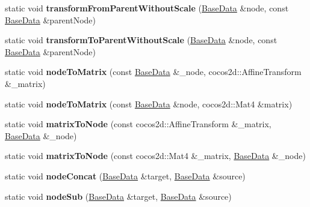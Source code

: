 \begin{DoxyCompactItemize}
\item 
\mbox{\label{classcocostudio_1_1TransformHelp_ab9fa5831a591b586040083c97b14e1a8}} 
static void {\bfseries transform\+From\+Parent\+Without\+Scale} (\hyperlink{classcocostudio_1_1BaseData}{Base\+Data} \&node, const \hyperlink{classcocostudio_1_1BaseData}{Base\+Data} \&parent\+Node)
\item 
\mbox{\label{classcocostudio_1_1TransformHelp_a80491e04b56e3205f461701a331e669e}} 
static void {\bfseries transform\+To\+Parent\+Without\+Scale} (\hyperlink{classcocostudio_1_1BaseData}{Base\+Data} \&node, const \hyperlink{classcocostudio_1_1BaseData}{Base\+Data} \&parent\+Node)
\item 
\mbox{\label{classcocostudio_1_1TransformHelp_a48cb72fa88aa6185ca992bf0713e0189}} 
static void {\bfseries node\+To\+Matrix} (const \hyperlink{classcocostudio_1_1BaseData}{Base\+Data} \&\+\_\+node, cocos2d\+::\+Affine\+Transform \&\+\_\+matrix)
\item 
\mbox{\label{classcocostudio_1_1TransformHelp_ad5b5773799a1db6e3c66c9d9bb96fde7}} 
static void {\bfseries node\+To\+Matrix} (const \hyperlink{classcocostudio_1_1BaseData}{Base\+Data} \&node, cocos2d\+::\+Mat4 \&matrix)
\item 
\mbox{\label{classcocostudio_1_1TransformHelp_a4ba91cbe8cf6d973ca702a2c361d1585}} 
static void {\bfseries matrix\+To\+Node} (const cocos2d\+::\+Affine\+Transform \&\+\_\+matrix, \hyperlink{classcocostudio_1_1BaseData}{Base\+Data} \&\+\_\+node)
\item 
\mbox{\label{classcocostudio_1_1TransformHelp_a4e55ad87d43ec7a7941ac0d8ec379fde}} 
static void {\bfseries matrix\+To\+Node} (const cocos2d\+::\+Mat4 \&\+\_\+matrix, \hyperlink{classcocostudio_1_1BaseData}{Base\+Data} \&\+\_\+node)
\item 
\mbox{\label{classcocostudio_1_1TransformHelp_a6fdc778608ef72f4ebea56994190badf}} 
static void {\bfseries node\+Concat} (\hyperlink{classcocostudio_1_1BaseData}{Base\+Data} \&target, \hyperlink{classcocostudio_1_1BaseData}{Base\+Data} \&source)
\item 
\mbox{\label{classcocostudio_1_1TransformHelp_aeb33a21fca5a0044fd47d70e8870d63a}} 
static void {\bfseries node\+Sub} (\hyperlink{classcocostudio_1_1BaseData}{Base\+Data} \&target, \hyperlink{classcocostudio_1_1BaseData}{Base\+Data} \&source)
\end{DoxyCompactItemize}
